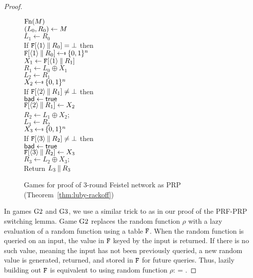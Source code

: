 \begin{proof}
\begin{figure}[t]
{\underline{$\textnormal{Fn}(M)$}\\
$(L_0, R_0) \gets M$\\
$L_1 \gets R_0$\\
If $\mathtt{F}[\langle1\rangle\: \| \: R_0] = \bot$ then\\
\ind $\TabF[\langle1\rangle\concat R_0] \getsr \bits^n$\\
$X_1 \gets \mathtt{F}[\langle1\rangle\: \| \: R_1]$\\
$R_1 \gets L_0 \oplus X_1$\\
$L_2 \gets R_1$\\
$X_2 \getsr \bits^n$\\
If $\mathtt{F}[\langle2\rangle\: \| \: R_1] \ne \bot$ then\\
\ind $\mathsf{bad}\gets\mathsf{true}$\\
$\mathtt{F}[\langle2\rangle\: \| \: R_1] \gets X_2$\\
$R_2 \gets L_1 \oplus X_2$;\;\;\\
$L_3 \gets R_2$\\
$X_3 \getsr \bits^n$\\
If $\mathtt{F}[\langle3\rangle\: \| \: R_2] \ne \bot$ then\\
\ind $\mathsf{bad}\gets\mathsf{true}$\\
$\mathtt{F}[\langle3\rangle\: \| \: R_2] \gets X_3$\\
$R_3 \gets L_2 \oplus X_3;$\;\;\\
Return $L_3 \: \| \: R_3$
}
\caption{Games for proof of 3-round Feistel network as PRP (Theorem~\ref{thm:luby-rackoff})}
\label{fig:games-luby-rackoff}
\end{figure}

In games ${{\textnormal G}}2$ and ${{\textnormal G}}3$, we use a similar trick to as in our proof of the PRF-PRP switching lemma.
Game ${{\textnormal G}}2$ replaces the random function $\rho$ with a lazy evaluation of a random function using a table $\mathtt{F}$.
When the random function is queried on an input, the value in $\mathtt{F}$ keyed by the input is returned.
If there is no such value, meaning the input has not been previously queried, a new random value is generated, returned, and stored in $\mathtt{F}$ for future queries.
Thus, lazily building out $\mathtt{F}$ is equivalent to using random function $\rho$:
\bnm
{} = .
\enm


\end{proof}
